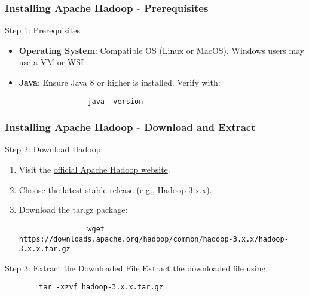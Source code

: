 \documentclass{beamer}
\begin{document}
\begin{frame}[fragile]
    \frametitle{Installing Apache Hadoop - Prerequisites}
    \begin{block}{Step 1: Prerequisites}
        \begin{itemize}
            \item \textbf{Operating System}: Compatible OS (Linux or MacOS). Windows users may use a VM or WSL.
            \item \textbf{Java}: Ensure Java 8 or higher is installed. Verify with:
                \begin{lstlisting}
                java -version
                \end{lstlisting}
        \end{itemize}
    \end{block}
\end{frame}

\begin{frame}[fragile]
    \frametitle{Installing Apache Hadoop - Download and Extract}
    \begin{block}{Step 2: Download Hadoop}
        \begin{enumerate}
            \item Visit the \href{https://hadoop.apache.org/releases.html}{official Apache Hadoop website}.
            \item Choose the latest stable release (e.g., Hadoop 3.x.x).
            \item Download the tar.gz package:
                \begin{lstlisting}
                wget https://downloads.apache.org/hadoop/common/hadoop-3.x.x/hadoop-3.x.x.tar.gz
                \end{lstlisting}
        \end{enumerate}
    \end{block}
    
    \begin{block}{Step 3: Extract the Downloaded File}
        Extract the downloaded file using:
        \begin{lstlisting}
        tar -xzvf hadoop-3.x.x.tar.gz
        \end{lstlisting}
    \end{block}
\end{frame}
\end{document}
